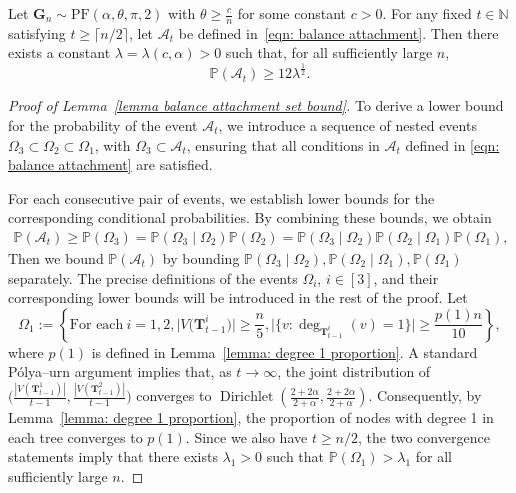 \documentclass[twoside,11pt]{article}
\theoremstyle{remark}
\begin{document}
\begin{lemma}
\label{lemma balance attachment set bound}
Let $\boldsymbol{G}_{n} \sim \mathrm{PF}(\alpha, \theta, \pi, 2)$ with $\theta \geq \frac{c}{n}$ for some constant $c>0$.
For any fixed $t\in \mathbb{N}$ satisfying $t\ge \lceil n/2\rceil$, let $\mathcal{A}_t$ be defined in~\eqref{eqn: balance attachment}.
Then there exists a constant $\lambda= \lambda(c, \alpha)>0$ such that, for all sufficiently large $n$,
%
\begin{equation*}
    \mathbb{P}\left(\mathcal{A}_t\right)\geq 12\lambda^{\frac{1}{2}}.
\end{equation*}
%
\end{lemma}
\begin{proof}[Proof of Lemma~\ref{lemma balance attachment set bound}]
To derive a lower bound for the probability of the event $\mathcal{A}_t$,
we introduce a sequence of nested events $\Omega_3 \subset \Omega_2 \subset \Omega_1$, with $\Omega_3 \subset \mathcal{A}_t$, ensuring that all conditions in $\mathcal{A}_t$ defined in \eqref{eqn: balance attachment} are satisfied.

For each consecutive pair of events, we establish lower bounds for the corresponding conditional probabilities.
By combining these bounds, we obtain 
%
\begin{eqnarray*}
\mathbb{P}\left(\mathcal{A}_t\right)\geq \mathbb{P}\left(\Omega_3\right)=  \mathbb{P}\left(\Omega_3\mid \Omega_2\right) \mathbb{P}\left(\Omega_2\right)= \mathbb{P}\left(\Omega_3\mid \Omega_2\right) \mathbb{P}\left(\Omega_2\mid \Omega_1\right)
\mathbb{P}\left(\Omega_1\right),
\end{eqnarray*}
%
Then we bound $\mathbb{P}\left(\mathcal{A}_t\right)$ by bounding $\mathbb{P}\left(\Omega_3\mid \Omega_2\right), \mathbb{P}\left(\Omega_2\mid \Omega_1\right), \mathbb{P}\left(\Omega_1\right)$ separately.
The precise definitions of the events $\Omega_i$, $i\in[3]$, 
and their corresponding lower bounds will be introduced in the rest of the proof.
Let
%
\begin{equation*}
\Omega_1:= \left\{\text{For each}\  i=1, 2,\bigl|V\bigl(\bm{T}^i_{t-1}\bigr)\bigr|\geq  \frac{n}{5}, 
\bigl|\bigl\{v: \operatorname{deg}_{\bm{T}^i_{t-1}}(v)=1\bigr\}\bigr|\geq \frac{p(1)n}{10}\right\},
\end{equation*}
%
where $p(1)$ is defined in Lemma~\ref{lemma: degree 1 proportion}.
A standard P\'olya–urn argument implies that, as $t \to\infty$, the joint distribution of $\bigl(\frac{|V(\bm{T}^1_{t-1})|}{t-1}, \frac{|V(\bm{T}^2_{t-1})|}{t-1}\bigr)$ converges to $\operatorname{Dirichlet}(\frac{2+2\alpha}{2+\alpha}, \frac{2+2\alpha}{2+\alpha})$.
Consequently, by Lemma~\ref{lemma: degree 1 proportion}, the proportion of nodes with degree 1 in each tree converges to $p(1)$.
Since we also have $t\geq n/2$, the two convergence statements imply that there exists $\lambda_1>0$ such that $\mathbb{P}\left(\Omega_1\right)>\lambda_1$ for all sufficiently large $n$. 



\end{proof}
\end{document}
